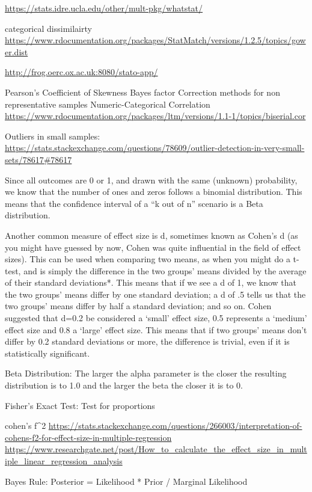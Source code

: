 \documentclass[]{book}
\begin{document}
\url{https://stats.idre.ucla.edu/other/mult-pkg/whatstat/}

categorical dissimilairty
\url{https://www.rdocumentation.org/packages/StatMatch/versions/1.2.5/topics/gower.dist}

\url{http://frog.oerc.ox.ac.uk:8080/stato-app/}

Pearson's Coefficient of Skewness \textbar{} Bayes factor \textbar{}
Correction methods for non representative samples \textbar{}
Numeric-Categorical Correlation
\url{https://www.rdocumentation.org/packages/ltm/versions/1.1-1/topics/biserial.cor}

Outliers in small samples:
\url{https://stats.stackexchange.com/questions/78609/outlier-detection-in-very-small-sets/78617\#78617}

Since all outcomes are 0 or 1, and drawn with the same (unknown)
probability, we know that the number of ones and zeros follows a
binomial distribution. This means that the confidence interval of a ``k
out of n'' scenario is a Beta distribution.

Another common measure of effect size is d, sometimes known as Cohen's d
(as you might have guessed by now, Cohen was quite influential in the
field of effect sizes). This can be used when comparing two means, as
when you might do a t-test, and is simply the difference in the two
groups' means divided by the average of their standard deviations*. This
means that if we see a d of 1, we know that the two groups' means differ
by one standard deviation; a d of .5 tells us that the two groups' means
differ by half a standard deviation; and so on. Cohen suggested that
d=0.2 be considered a `small' effect size, 0.5 represents a `medium'
effect size and 0.8 a `large' effect size. This means that if two
groups' means don't differ by 0.2 standard deviations or more, the
difference is trivial, even if it is statistically significant.

Beta Distribution: The larger the alpha parameter is the closer the
resulting distribution is to 1.0 and the larger the beta the closer it
is to 0.

Fisher's Exact Test: Test for proportions

cohen's f\^{}2 \textbar{}
\url{https://stats.stackexchange.com/questions/266003/interpretation-of-cohens-f2-for-effect-size-in-multiple-regression}
\textbar{}
\url{https://www.researchgate.net/post/How_to_calculate_the_effect_size_in_multiple_linear_regression_analysis}

Bayes Rule: Posterior = Likelihood * Prior / Marginal Likelihood
\end{document}
